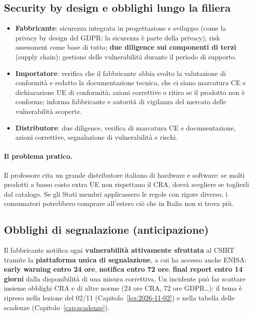\subsection{Security by design e obblighi lungo la filiera}
\begin{itemize}
  \item \textbf{Fabbricante}: sicurezza integrata in progettazione e sviluppo (come la privacy by design
    del GDPR: la sicurezza è parte della privacy); risk assessment come base di tutto; \textbf{due
    diligence sui componenti di terzi} (supply chain); gestione delle vulnerabilità durante il periodo di
    supporto.
  \item \textbf{Importatore}: verifica che il fabbricante abbia svolto la valutazione di conformità e
    redatto la documentazione tecnica, che ci siano marcatura CE e dichiarazione UE di conformità; azioni
    correttive o ritiro se il prodotto non è conforme; informa fabbricante e autorità di vigilanza del
    mercato delle vulnerabilità scoperte.
  \item \textbf{Distributore}: due diligence, verifica di marcatura CE e documentazione, azioni correttive,
    segnalazione di vulnerabilità e rischi.
\end{itemize}
\paragraph{Il problema pratico.} Il professore cita un grande distributore italiano di hardware e software:
se molti prodotti a basso costo extra UE non rispettano il CRA, dovrà scegliere se toglierli dal catalogo.
Se gli Stati membri applicassero le regole con rigore diverso, i consumatori potrebbero comprare
all'estero ciò che in Italia non si trova più.

\subsection{Obblighi di segnalazione (anticipazione)}
Il fabbricante notifica ogni \textbf{vulnerabilità attivamente sfruttata} al CSIRT tramite la
\textbf{piattaforma unica di segnalazione}, a cui ha accesso anche ENISA: \textbf{early warning entro 24
ore}, \textbf{notifica entro 72 ore}, \textbf{final report entro 14 giorni} dalla disponibilità di una
misura correttiva. Un incidente può far scattare insieme obblighi CRA e di altre norme (24 ore CRA, 72 ore
GDPR\ldots): il tema è ripreso nella lezione del 02/11 (Capitolo~\ref{lez:2026-11-02}) e nella tabella
delle scadenze (Capitolo~\ref{cap:scadenze}).

